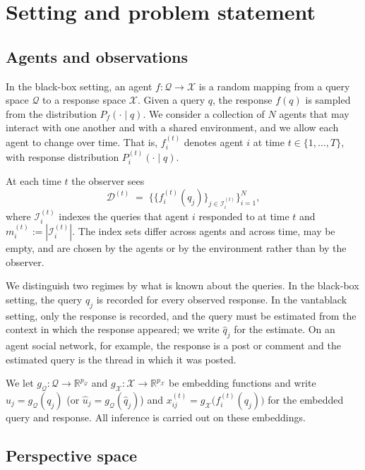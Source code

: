 \documentclass{article}
\theoremstyle{plain}
\theoremstyle{definition}
\newcommand{\Q}{\mathcal{Q}}
\newcommand{\X}{\mathcal{X}}
\newcommand{\R}{\mathbb{R}}
\newcommand{\I}{\mathcal{I}}
\newcommand{\D}{\mathcal{D}}
\begin{document}
\section{Setting and problem statement}
\label{sec:setting}

\subsection{Agents and observations}

In the black-box setting, an agent $f:\Q\to\X$ is a random mapping from a query space $\Q$ to a response space $\X$. Given a query $q$, the response $f(q)$ is sampled from the distribution $P_f(\cdot\mid q)$. We consider a collection of $N$ agents that may interact with one another and with a shared environment, and we allow each agent to change over time. That is, $f_i^{(t)}$ denotes agent $i$ at time $t\in\{1,\dots,T\}$, with response distribution $P_i^{(t)}(\cdot\mid q)$.

At each time $t$ the observer sees
\begin{equation}
\label{eq:obs}
\D^{(t)} \;=\; \Big\{\big\{ f_i^{(t)}(q_j) \big\}_{j\in\I_i^{(t)}}\Big\}_{i=1}^{N},
\end{equation}
where $\I_i^{(t)}$ indexes the queries that agent $i$ responded to at time $t$ and $m_i^{(t)} := |\I_i^{(t)}|$. The index sets differ across agents and across time, may be empty, and are chosen by the agents or by the environment rather than by the observer.

We distinguish two regimes by what is known about the queries. In the black-box setting, the query $q_j$ is recorded for every observed response. In the vantablack setting, only the response is recorded, and the query must be estimated from the context in which the response appeared; we write $\hat q_j$ for the estimate. On an agent social network, for example, the response is a post or comment and the estimated query is the thread in which it was posted.

We let $g_\Q:\Q\to\R^{p_\Q}$ and $g_\X:\X\to\R^{p_\X}$ be embedding functions and write $u_j = g_\Q(q_j)$ (or $\hat u_j = g_\Q(\hat q_j)$) and $x_{ij}^{(t)} = g_\X\big(f_i^{(t)}(q_j)\big)$ for the embedded query and response. All inference is carried out on these embeddings.

\subsection{Perspective space}
\label{sec:ps}
\end{document}
